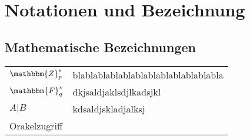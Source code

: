 \chapter{Notationen und Bezeichnung}
\section{Mathematische Bezeichnungen}

\setlength{\tabcolsep}{12pt}
\def\arraystretch{1.5}%
\begin{tabular}{l|l}
	$\mathbbm{Z}^{\ast}_p$ & blablablablablablablablablablablabla\\
	$\mathbbm{F}^{\ast}_q$ & dkjsaldjaklsdjlkadsjkl\\
	$A \vert B$ & kdsaldjskladjalksj\\
	Orakelzugriff
\end{tabular}



